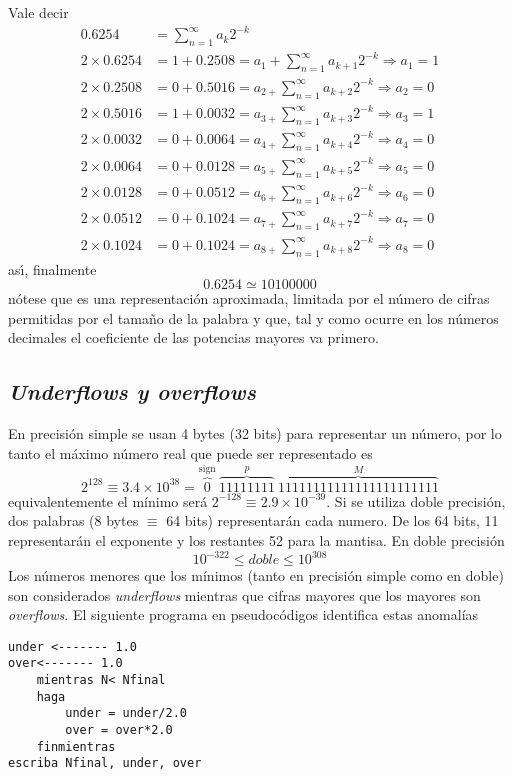 \documentclass[spanish,titlepage,11pt]{article}
\begin{document}
Vale decir
\begin{align}
0.6254  &  =\sum_{n=1}^{\infty}a_{k}2^{-k}\\
2\times0.6254  &  =1+0.2508=a_{1}+\sum_{n=1}^{\infty}a_{k+1}2^{-k}%
\Longrightarrow a_{1}=1\\
2\times0.2508  &  =0+0.5016=a_{2+}\sum_{n=1}^{\infty}a_{k+2}2^{-k}%
\Longrightarrow a_{2}=0\\
2\times0.5016  &  =1+0.0032=a_{3+}\sum_{n=1}^{\infty}a_{k+3}2^{-k}%
\Longrightarrow a_{3}=1\\
2\times0.0032  &  =0+0.0064=a_{4+}\sum_{n=1}^{\infty}a_{k+4}2^{-k}%
\Longrightarrow a_{4}=0\\
2\times0.0064  &  =0+0.0128=a_{5+}\sum_{n=1}^{\infty}a_{k+5}2^{-k}%
\Longrightarrow a_{5}=0\\
2\times0.0128  &  =0+0.0512=a_{6+}\sum_{n=1}^{\infty}a_{k+6}2^{-k}%
\Longrightarrow a_{6}=0\\
2\times0.0512  &  =0+0.1024=a_{7+}\sum_{n=1}^{\infty}a_{k+7}2^{-k}%
\Longrightarrow a_{7}=0\\
2\times0.1024  &  =0+0.1024=a_{8+}\sum_{n=1}^{\infty}a_{k+8}2^{-k}%
\Longrightarrow a_{8}=0
\end{align}
as\'{\i}, finalmente
\begin{equation}
0.6254\simeq10100000
\end{equation}
n\'{o}tese que es una representaci\'{o}n aproximada, limitada por el
n\'{u}mero de cifras permitidas por el tama\~{n}o de la palabra y que, tal y
como ocurre en los n\'{u}meros decimales el coeficiente de las potencias
mayores va primero.

\subsection{\textit{Underflows y overflows}}

En precisi\'{o}n simple se usan 4 bytes (32 bits) para representar un
n\'{u}mero, por lo tanto el m\'{a}ximo n\'{u}mero real que puede ser
representado es
\begin{equation}
2^{128}\equiv3.4\times10^{38}=\overset{\operatorname*{sign}}{\overbrace{0}%
}\ \overset{p}{\overbrace{11111111}}\ \overset{M}{\overbrace
{11111111111111111111111}}%
\end{equation}
equivalentemente el m\'{i}nimo ser\'{a} $2^{-128}\equiv2.9\times10^{-39}.$ Si
se utiliza doble precisi\'{o}n, dos palabras (8 bytes $\equiv$ 64 bits)
representar\'{a}n cada numero. De los 64 bits, 11 representar\'{a}n el
exponente y los restantes 52 para la mantisa. En doble precisi\'{o}n
\begin{equation}
10^{-322}\leq doble\leq10^{308}%
\end{equation}
Los n\'{u}meros menores que los m\'{i}nimos (tanto en precisi\'{o}n simple
como en doble) son considerados \textit{underflows} mientras que cifras
mayores que los mayores son \textit{overflows}. El siguiente programa en
pseudoc\'{o}digos identifica estas anomal\'{i}as
\begin{verbatim}
under <------- 1.0
over<------- 1.0
    mientras N< Nfinal
    haga
        under = under/2.0
        over = over*2.0
    finmientras
escriba Nfinal, under, over
\end{verbatim}
\end{document}
